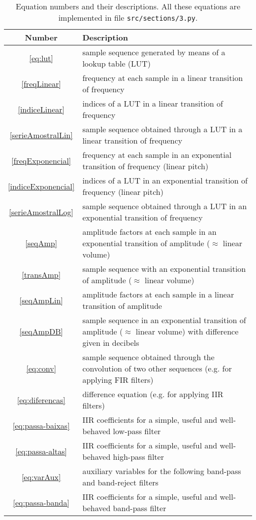 \documentclass{scrreprt}
\begin{document}
\begin{table*}[htp!]
\centering
\caption{Equation numbers and their descriptions.
All these equations are implemented in file \texttt{src/sections/3.py}.}
\begin{tabular}{ c | p{12cm} }
   Number & Description \\\hline
 \ref{eq:lut} & sample sequence generated by means of a lookup table (LUT) \\
 \ref{freqLinear} & frequency at each sample in a linear transition of frequency \\
 \ref{indiceLinear} & indices of a LUT in a linear transition of frequency \\
 \ref{serieAmostralLin} & sample sequence obtained through a LUT in a linear transition of frequency \\
 \ref{freqExponencial} & frequency at each sample in an exponential transition of frequency (linear pitch) \\
 \ref{indiceExponencial} & indices of a LUT in an exponential transition of frequency (linear pitch) \\
 \ref{serieAmostralLog} & sample sequence obtained through a LUT in an exponential transition of frequency \\
 \ref{seqAmp} & amplitude factors at each sample in an exponential transition of amplitude ($\approx$ linear volume) \\
 \ref{transAmp} & sample sequence with an exponential transition of amplitude ($\approx$ linear volume) \\
 \ref{seqAmpLin} & amplitude factors at each sample in a linear transition of amplitude \\
 \ref{seqAmpDB} & sample sequence in an exponential transition of amplitude ($\approx$ linear volume) with difference given in decibels \\
 \ref{eq:conv} & sample sequence obtained through the convolution of two other sequences (e.g. for applying FIR filters) \\
 \ref{eq:diferencas} & difference equation (e.g. for applying IIR filters) \\
 \ref{eq:passa-baixas} & IIR coefficients for a simple, useful and well-behaved low-pass filter \\
 \ref{eq:passa-altas} & IIR coefficients for a simple, useful and well-behaved high-pass filter \\
 \ref{eq:varAux} & auxiliary variables for the following band-pass and band-reject filters \\
 \ref{eq:passa-banda} & IIR coefficients for a simple, useful and well-behaved band-pass filter \\

\end{tabular}
\end{table*}
\end{document}
